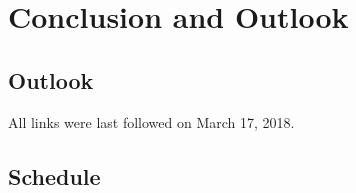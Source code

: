 \documentclass[
  a4paper,  %
  twoside,  %
  bibliography=totoc,
  headsepline,
  cleardoublepage=empty,
  parskip=half,
  draft=false
]{scrbook}
\begin{document}
\chapter{Conclusion and Outlook}
\label{chap:zusfas}

\section*{Outlook}

\printbibliography

All links were last followed on March 17, 2018.



\newpage
\appendix


\section{Schedule}
\end{document}
